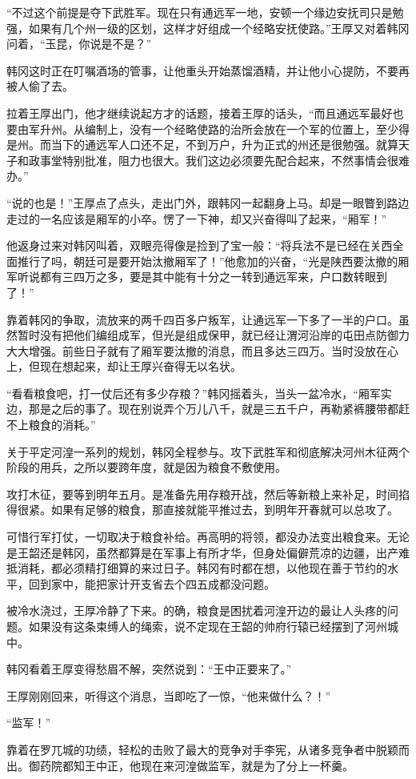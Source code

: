 “不过这个前提是夺下武胜军。现在只有通远军一地，安顿一个缘边安抚司只是勉强，如果有几个州一级的区划，这样才好组成一个经略安抚使路。”王厚又对着韩冈问着，“玉昆，你说是不是？”

韩冈这时正在叮嘱酒场的管事，让他重头开始蒸馏酒精，并让他小心提防，不要再被人偷了去。

拉着王厚出门，他才继续说起方才的话题，接着王厚的话头，“而且通远军最好也要由军升州。从编制上，没有一个经略使路的治所会放在一个军的位置上，至少得是州。而当下的通远军人口还不足，不到万户，升为正式的州还是很勉强。就算天子和政事堂特别批准，阻力也很大。我们这边必须要先配合起来，不然事情会很难办。”

“说的也是！”王厚点了点头，走出门外，跟韩冈一起翻身上马。却是一眼瞥到路边走过的一名应该是厢军的小卒。愣了一下神，却又兴奋得叫了起来，“厢军！”

他返身过来对韩冈叫着，双眼亮得像是捡到了宝一般：“将兵法不是已经在关西全面推行了吗，朝廷可是要开始汰撤厢军了！”他愈加的兴奋，“光是陕西要汰撤的厢军听说都有三四万之多，要是其中能有十分之一转到通远军来，户口数转眼到了！”

靠着韩冈的争取，流放来的两千四百多户叛军，让通远军一下多了一半的户口。虽然暂时没有把他们编组成军，但光是组成保甲，就已经让渭河沿岸的屯田点防御力大大增强。前些日子就有了厢军要汰撤的消息，而且多达三四万。当时没放在心上，但现在想起来，却让王厚兴奋得无以名状。

“看看粮食吧，打一仗后还有多少存粮？”韩冈摇着头，当头一盆冷水，“厢军实边，那是之后的事了。现在别说弄个万儿八千，就是三五千户，再勒紧裤腰带都赶不上粮食的消耗。”

关于平定河湟一系列的规划，韩冈全程参与。攻下武胜军和彻底解决河州木征两个阶段的用兵，之所以要跨年度，就是因为粮食不敷使用。

攻打木征，要等到明年五月。是准备先用存粮开战，然后等新粮上来补足，时间掐得很紧。如果有足够的粮食，那直接就能平推过去，到明年开春就可以总攻了。

可惜行军打仗，一切取决于粮食补给。再高明的将领，都没办法变出粮食来。无论是王韶还是韩冈，虽然都算是在军事上有所才华，但身处偏僻荒凉的边疆，出产难抵消耗，都必须精打细算的来过日子。韩冈有时都在想，以他现在善于节约的水平，回到家中，能把家计开支省去个四五成都没问题。

被冷水浇过，王厚冷静了下来。的确，粮食是困扰着河湟开边的最让人头疼的问题。如果没有这条束缚人的绳索，说不定现在王韶的帅府行辕已经摆到了河州城中。

韩冈看着王厚变得愁眉不解，突然说到：“王中正要来了。”

王厚刚刚回来，听得这个消息，当即吃了一惊，“他来做什么？！”

“监军！”

靠着在罗兀城的功绩，轻松的击败了最大的竞争对手李宪，从诸多竞争者中脱颖而出。御药院都知王中正，他现在来河湟做监军，就是为了分上一杯羹。

